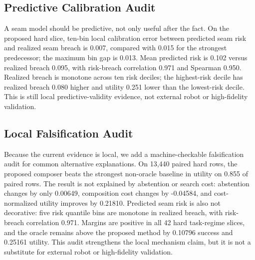 \documentclass{article}
\begin{document}
\subsection{Predictive Calibration Audit}
A seam model should be predictive, not only useful after the fact. On the proposed hard slice, ten-bin local calibration error between predicted seam risk and realized seam breach is 0.007, compared with 0.015 for the strongest predecessor; the maximum bin gap is 0.013. Mean predicted risk is 0.102 versus realized breach 0.095, with risk-breach correlation 0.971 and Spearman 0.950. Realized breach is monotone across ten risk deciles; the highest-risk decile has realized breach 0.080 higher and utility 0.251 lower than the lowest-risk decile. This is still local predictive-validity evidence, not external robot or high-fidelity validation.
\begin{center}\small\resizebox{\linewidth}{!}{}\end{center}
\subsection{Local Falsification Audit}
Because the current evidence is local, we add a machine-checkable falsification audit for common alternative explanations. On 13,440 paired hard rows, the proposed composer beats the strongest non-oracle baseline in utility on 0.855 of paired rows. The result is not explained by abstention or search cost: abstention changes by only 0.00649, composition cost changes by -0.04584, and cost-normalized utility improves by 0.21810. Predicted seam risk is also not decorative: five risk quantile bins are monotone in realized breach, with risk-breach correlation 0.971. Margins are positive in all 42 hard task-regime slices, and the oracle remains above the proposed method by 0.10796 success and 0.25161 utility. This audit strengthens the local mechanism claim, but it is not a substitute for external robot or high-fidelity validation.
\begin{table}[t]\centering\small\resizebox{\linewidth}{!}{}\caption{Local falsification checks against common alternative explanations. The audit is generated from episode-level local hard-slice rows and does not satisfy the external-evidence gate.}\label{tab:falsification}\end{table}
\end{document}
